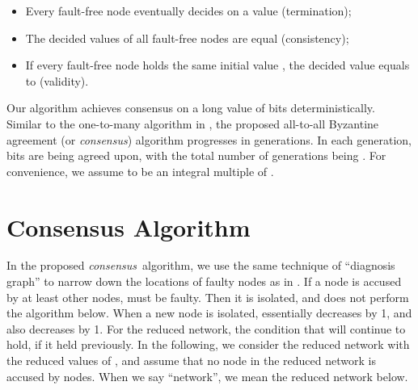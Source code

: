 \documentclass[12pt]{article}
\begin{document}
\begin{itemize}
\item Every fault-free node eventually decides on a value (termination);
\item The decided values of all fault-free nodes are equal (consistency);
\item If every fault-free node holds the same initial value , the decided value equals to  (validity).
\end{itemize}


Our algorithm achieves consensus on a long value of  bits deterministically. Similar to the one-to-many algorithm in \cite{techreport_BA_complexity}, the proposed all-to-all Byzantine agreement (or {\em consensus})
 algorithm  progresses in generations. In each generation,  bits are being agreed upon, with the total number of generations being .
For convenience, we assume  to be an integral multiple of .

\section{Consensus Algorithm}\label{sec:algorithm}
In the proposed {\em consensus}\, algorithm, we use the same technique of ``diagnosis graph'' to narrow down the locations of faulty nodes as in \cite{techreport_BA_complexity}. If a node  is accused by at least  other nodes,  must be faulty. Then it is isolated,
and does not perform the algorithm below. When a new node is isolated,
essentially  decreases by 1, and  also decreases by 1. For the
reduced network, the condition that  will continue to hold, if
it held previously. In the
following, we consider the reduced network with the reduced values of
, and assume that no node in the reduced network is accused by  nodes.
When we say ``network'', we mean the reduced network below.
\end{document}
